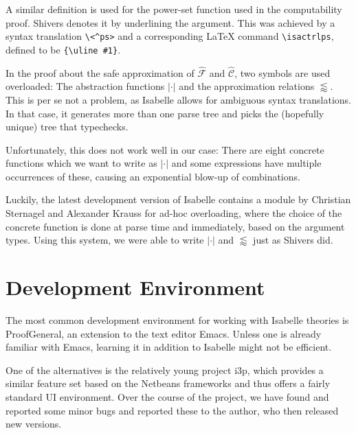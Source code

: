 \documentclass[a4paper,halfparskip,DIV=10,11pt]{scrbook}
\newcommand{\aC}{\widehat{\mathcal C}}
\newcommand{\aF}{\widehat{\mathcal F}}
\begin{document}
A similar definition is used for the power-set function used in the computability proof. Shivers denotes it by underlining the argument. This was achieved by a syntax translation \texttt{\textbackslash <\^{}ps>} and a corresponding \LaTeX{} command \texttt{\textbackslash isactrlps}, defined to be \texttt{\{\textbackslash uline \#1\}}.

In the proof about the safe approximation of $\aF$ and $\aC$, two symbols are used overloaded: The abstraction functions $|\cdot|$ and the approximation relations $\lessapprox$. This is per se not a problem, as Isabelle allows for ambiguous syntax translations. In that case, it generates more than one parse tree and picks the (hopefully unique) tree that typechecks.

Unfortunately, this does not work well in our case: There are eight concrete functions which we want to write as $|\cdot|$ and some expressions have multiple occurrences of these, causing an exponential blow-up of combinations.

Luckily, the latest development version of Isabelle contains a module by Christian Sternagel and Alexander Krauss for ad-hoc overloading, where the choice of the concrete function is done at parse time and immediately, based on the argument types. Using this system, we were able to write $|\cdot|$ and $\lessapprox$ just as Shivers did.

\section{Development Environment}

The most common development environment for working with Isabelle theories is ProofGeneral, an extension to the text editor Emacs. 
Unless one is already familiar with Emacs, learning it in addition to Isabelle might not be efficient.

One of the alternatives is the relatively young project i3p\citep{i3p}, which provides a similar feature set based on the Netbeans frameworks and thus offers a fairly standard UI environment. Over the course of the project, we have found and reported some minor bugs and reported these to the author, who then released new versions.
\end{document}
